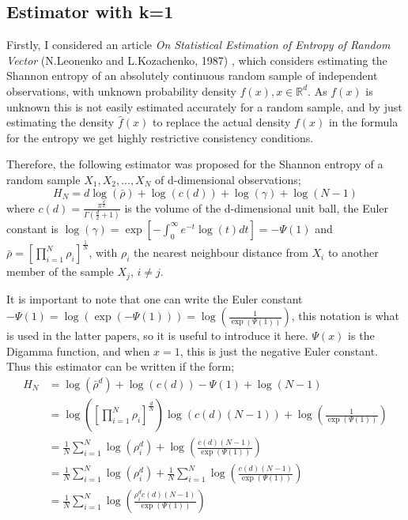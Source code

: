 \documentclass{report}
\begin{document}
\subsection{Estimator with k=1}

Firstly, I considered an article \textit{On Statistical Estimation of Entropy of Random Vector} (N.Leonenko and L.Kozachenko, 1987) \cite{paper1}, which considers estimating the Shannon entropy of an absolutely continuous random sample of independent observations, with unknown probability density $f(x), x \in \mathbb{R}^{d}$. As $f(x)$ is unknown this is not easily estimated accurately for a random sample, and by just estimating the density $\hat{f}(x)$ to replace the actual density $f(x)$ in the formula for the entropy we get highly restrictive consistency conditions. 

Therefore, the following estimator was proposed for the Shannon entropy of a random sample $X_{1}, X_{2}, ..., X_{N}$ of d-dimensional observations;
\begin{equation}
H_{N} = d \log(\bar{\rho } ) + \log (c(d)) + \log (\gamma) + \log (N-1)
\end{equation}
where $c(d) = \frac{\pi^{\frac{d}{2}}}{\Gamma ( \frac{d}{2} + 1 )}$ is the volume of the d-dimensional unit ball, the Euler constant is $\log (\gamma) = \exp \left[ - \int_{0}^{\infty} e^{-t} \log(t) dt \right] = -\Psi(1)$ and $\bar{\rho} = \left[ \prod_{i=1}^{N} \rho_{i} \right]^{\frac{1}{N}}$, with $\rho_{i}$ the nearest neighbour distance from $X_{i}$ to another member of the sample $X_{j}$, $i \neq j$. 

It is important to note that one can write the Euler constant $-\Psi(1) = \log (\exp(-\Psi(1))) = \log (\frac{1}{\exp(\Psi(1))})$, this notation is what is used in the latter papers, so it is useful to introduce it here. $\Psi(x)$ is the Digamma function, and when $x=1$, this is just the negative Euler constant. Thus this estimator can be written if the form;
\begin{align}
H_{N} &= \log(\bar{\rho}^{d} ) + \log (c(d)) - \Psi(1)  + \log (N-1) \nonumber \\
&= \log \left( \left[ \prod_{i=1}^{N} \rho_{i} \right]^{\frac{d}{N}} \right) \log( c(d) (N-1)) + \log \left(\frac{1}{\exp(\Psi(1))}\right) \nonumber \\
&= \frac{1}{N} \sum_{i=1}^{N} \log( \rho_{i}^{d} ) + \log \left( \frac{c(d) (N-1)}{ \exp(\Psi(1))} \right) \nonumber \\
&= \frac{1}{N} \sum_{i=1}^{N}\log(\rho_{i}^{d}) + \frac{1}{N} \sum_{i=1}^{N} \log \left( \frac{c(d) (N-1)}{\exp(\Psi(1))}\right) \nonumber \\
&= \frac{1}{N} \sum_{i=1}^{N} \log \left( \frac{\rho_{i}^{d} c(d) (N-1)}{\exp(\Psi(1))}\right) \label{Est_k=1}
\end{align}
\end{document}

